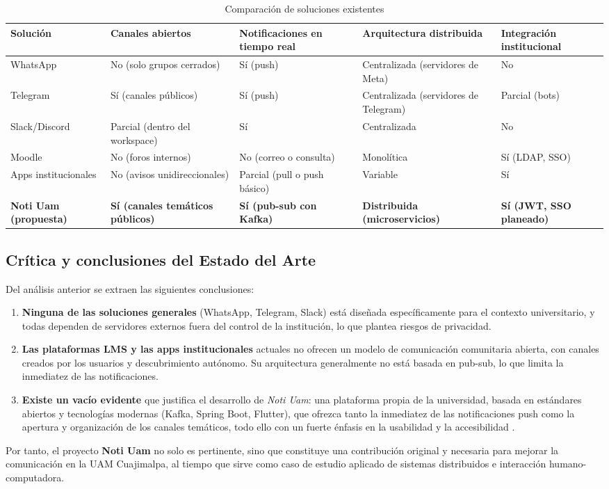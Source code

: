 \begin{table}[H]
\centering
\small
\begin{tabular}{|p{2.2cm}|p{2.5cm}|p{2.5cm}|p{2.5cm}|p{2.5cm}|}
\hline
\textbf{Solución} & \textbf{Canales abiertos} & \textbf{Notificaciones en tiempo real} & \textbf{Arquitectura distribuida} & \textbf{Integración institucional} \\
\hline
WhatsApp & No (solo grupos cerrados) & Sí (push) & Centralizada (servidores de Meta) & No \\
\hline
Telegram & Sí (canales públicos) & Sí (push) & Centralizada (servidores de Telegram) & Parcial (bots) \\
\hline
Slack/Discord & Parcial (dentro del workspace) & Sí & Centralizada & No \\
\hline
Moodle & No (foros internos) & No (correo o consulta) & Monolítica & Sí (LDAP, SSO) \\
\hline
Apps institucionales & No (avisos unidireccionales) & Parcial (pull o push básico) & Variable & Sí \\
\hline
\textbf{Noti Uam (propuesta)} & \textbf{Sí (canales temáticos públicos)} & \textbf{Sí (pub-sub con Kafka)} & \textbf{Distribuida (microservicios)} & \textbf{Sí (JWT, SSO planeado)} \\
\hline
\end{tabular}
\caption{Comparación de soluciones existentes}
\label{tab:comparativa}
\end{table}

\subsection{Crítica y conclusiones del Estado del Arte}

Del análisis anterior se extraen las siguientes conclusiones:

\begin{enumerate}
    \item \textbf{Ninguna de las soluciones generales} (WhatsApp, Telegram, Slack) está diseñada específicamente para el contexto universitario, y todas dependen de servidores externos fuera del control de la institución, lo que plantea riesgos de privacidad.
    \item \textbf{Las plataformas LMS y las apps institucionales} actuales no ofrecen un modelo de comunicación comunitaria abierta, con canales creados por los usuarios y descubrimiento autónomo. Su arquitectura generalmente no está basada en pub-sub, lo que limita la inmediatez de las notificaciones.
    \item \textbf{Existe un vacío evidente} que justifica el desarrollo de \textit{Noti Uam}: una plataforma propia de la universidad, basada en estándares abiertos y tecnologías modernas (Kafka, Spring Boot, Flutter), que ofrezca tanto la inmediatez de las notificaciones push como la apertura y organización de los canales temáticos, todo ello con un fuerte énfasis en la usabilidad y la accesibilidad \cite{amexcomp2020ihc}.
\end{enumerate}

Por tanto, el proyecto \textbf{Noti Uam} no solo es pertinente, sino que constituye una contribución original y necesaria para mejorar la comunicación en la UAM Cuajimalpa, al tiempo que sirve como caso de estudio aplicado de sistemas distribuidos e interacción humano-computadora.